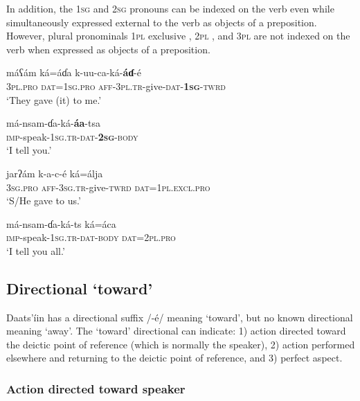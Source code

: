 \documentclass[output=paper]{langsci/langscibook}
\begin{document}
In addition, the \textsc{1sg}  and \textsc{2sg}  pronouns can be indexed on the verb even while simultaneously expressed external to the verb as objects of a preposition. However, plural pronominals \textsc{1pl} exclusive , 2\textsc{pl} , and 3\textsc{pl}  are not indexed on the verb when expressed as objects of a preposition.

\ea\label{ex:ahlandc:25}
\gll
m\'{a}ʕ\'{a}m  k\'{a}=\'{a}ɗa  k-uu-ca-k\'{a}-\textbf{\'{a}ɗ}{}-\'{e}  \\ 
\textsc{3pl.pro}  \textsc{dat=1sg.pro}  \textsc{aff-3pl.tr}{}-give-\textsc{dat}{}-\textbf{1}\textbf{\textsc{sg}}\textsc{{}-twrd} \\
\glt
‘They gave (it) to me.’
\z

\ea\label{ex:ahlandc:26}
\gll
m\'{a}-nsam-ɗa-k\'{a}-\textbf{\'{a}a}{}-tsa \\
\textsc{imp}{}-speak-\textsc{1sg.tr}{}-\textsc{dat}{}-\textbf{\textsc{2sg}}{}-\textsc{body} \\ 
\glt
‘I tell you.’
\z

\ea\label{ex:ahlandc:27}
\gll
jarʔ\'{a}m     k-a-c-\'{e}    k\'{a}=\'{a}lja  \\ 
3\textsc{sg.pro}  \textsc{aff-3sg.tr}{}-give-\textsc{twrd}  \textsc{dat=1pl.excl.pro} \\
\glt
‘S/He gave to us.’
\z

\ea\label{ex:ahlandc:28}
\gll
m\'{a}-nsam-ɗa-k\'{a}-ts    k\'{a}=\'{a}ca \\
\textsc{imp}{}-speak-\textsc{1sg.tr-dat-body}  \textsc{dat=2pl.pro} \\
\glt
‘I tell you all.’
\z

\subsection{Directional ‘toward’}\label{sec:ahlandc:4.6}

Daats’\'{i}in has a directional suffix /-\'{e}/ meaning ‘toward’, but no known directional meaning ‘away’. The ‘toward’ directional can indicate: 1) action directed toward the deictic point of reference (which is normally the speaker), 2) action performed elsewhere and returning to the deictic point of reference, and 3) perfect aspect.

\subsubsection{Action directed toward speaker}\label{sec:ahlandc:4.6.1}
\end{document}
